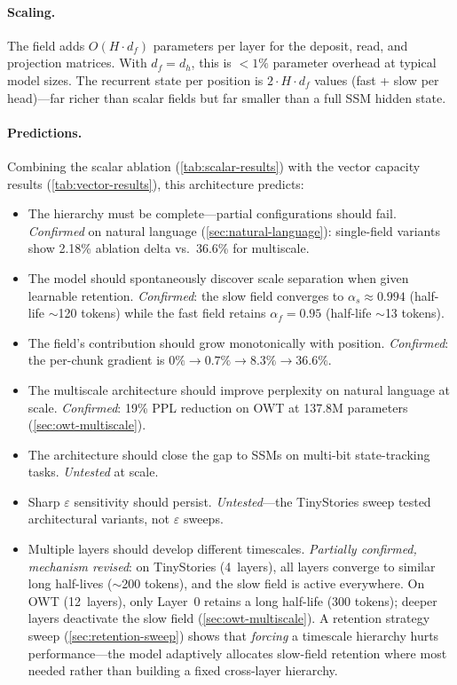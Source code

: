 \documentclass[11pt,a4paper]{article}
\newcommand{\evap}{\varepsilon}
\newcommand{\retain}{\alpha}
\begin{document}
\paragraph{Scaling.}  The field adds $O(H \cdot d_f)$ parameters per
layer for the deposit, read, and projection matrices.  With
$d_f = d_h$, this is $<1\%$ parameter overhead at typical model sizes.
The recurrent state per position is $2 \cdot H \cdot d_f$ values
(fast + slow per head)---far richer than scalar fields but far
smaller than a full SSM hidden state.

\paragraph{Predictions.}  Combining the scalar ablation
(\cref{tab:scalar-results}) with the vector capacity results
(\cref{tab:vector-results}), this architecture predicts:
\begin{itemize}
  \item The hierarchy must be complete---partial configurations
    should fail.  \emph{Confirmed} on natural language
    (\cref{sec:natural-language}): single-field variants show
    2.18\% ablation delta vs.\ 36.6\% for multiscale.
  \item The model should spontaneously discover scale separation
    when given learnable retention.  \emph{Confirmed}: the slow
    field converges to $\retain_s \approx 0.994$ (half-life
    $\sim$120 tokens) while the fast field retains
    $\retain_f = 0.95$ (half-life $\sim$13 tokens).
  \item The field's contribution should grow monotonically with
    position.  \emph{Confirmed}: the per-chunk gradient is
    $0\% \to 0.7\% \to 8.3\% \to 36.6\%$.
  \item The multiscale architecture should improve perplexity on
    natural language at scale.  \emph{Confirmed}: 19\% PPL reduction
    on OWT at 137.8M parameters (\cref{sec:owt-multiscale}).
  \item The architecture should close the gap to SSMs on
    multi-bit state-tracking tasks.  \emph{Untested} at scale.
  \item Sharp $\evap$ sensitivity should persist.
    \emph{Untested}---the TinyStories sweep tested architectural
    variants, not $\evap$ sweeps.
  \item Multiple layers should develop different timescales.
    \emph{Partially confirmed, mechanism revised}: on TinyStories
    (4~layers), all layers converge to similar long half-lives
    ($\sim$200 tokens), and the slow field is active everywhere.  On
    OWT (12~layers), only Layer~0 retains a long half-life (300
    tokens); deeper layers deactivate the slow field
    (\cref{sec:owt-multiscale}).  A retention strategy sweep
    (\cref{sec:retention-sweep}) shows that \emph{forcing} a
    timescale hierarchy hurts performance---the model adaptively
    allocates slow-field retention where most needed rather than
    building a fixed cross-layer hierarchy.
\end{itemize}
\end{document}
